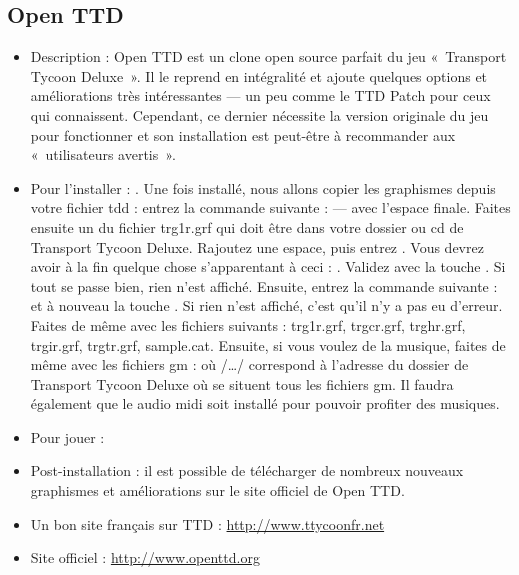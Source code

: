 \subsection{Open TTD}
\begin{itemize}
\begingroup
{}
\item Description : Open TTD est un clone open source parfait du jeu «~Transport Tycoon Deluxe~». Il le reprend en intégralité et ajoute quelques options et améliorations très intéressantes --- un peu comme le TTD Patch pour ceux qui connaissent. Cependant, ce dernier nécessite la version originale du jeu pour fonctionner et son installation est peut-être à recommander aux «~utilisateurs avertis~».{\par}
\endgroup
\item Pour l'installer : . Une fois installé, nous allons copier les graphismes depuis votre fichier tdd : entrez la commande suivante :  --- avec l'espace finale. Faites ensuite un  du fichier trg1r.grf qui doit être dans votre dossier ou cd de Transport Tycoon Deluxe. Rajoutez une espace, puis entrez  . Vous devrez avoir à la fin quelque chose s'apparentant à ceci : . Validez avec la touche . Si tout se passe bien, rien n'est affiché. Ensuite, entrez la commande suivante :  et à nouveau la touche . Si rien n'est affiché, c'est qu'il n'y a pas eu d'erreur. Faites de même avec les fichiers suivants : trg1r.grf, trgcr.grf, trghr.grf, trgir.grf, trgtr.grf, sample.cat. Ensuite, si vous voulez de la musique, faites de même avec les fichiers gm :
 où /\ldots{}/ correspond à l'adresse du dossier de Transport Tycoon Deluxe où se situent tous les fichiers gm. Il faudra également que le  audio midi soit installé  pour pouvoir profiter des musiques.{\par}
\item Pour jouer : 
\item Post-installation : il est possible de télécharger de nombreux nouveaux graphismes et améliorations sur le site officiel de Open TTD.{\par}
\item Un bon site français sur TTD : \url{http://www.ttycoonfr.net}{\par}
\item Site officiel : \url{http://www.openttd.org}{\par}
\end{itemize}
